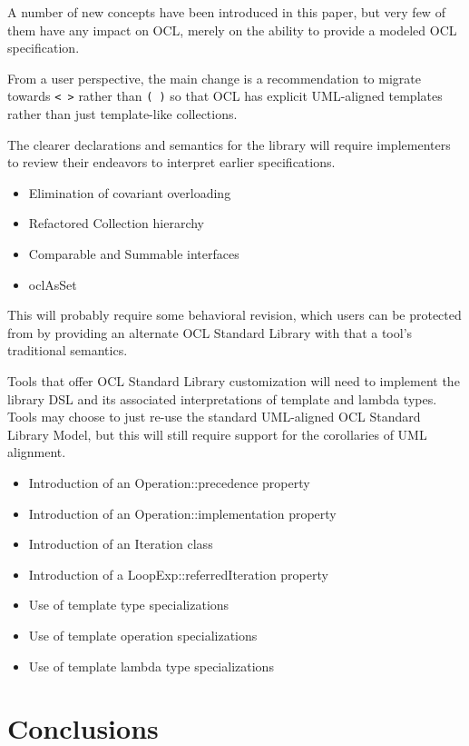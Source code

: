 \documentclass{eceasst}
\begin{document}
A number of new concepts have been introduced in this paper, but very few of them have any impact on OCL, merely on the ability to provide a modeled OCL specification.

From a user perspective, the main change is a recommendation to migrate towards \verb|< >| rather than \verb|( )| so that OCL has explicit UML-aligned templates rather than just template-like collections.

The clearer declarations and semantics for the library will require implementers to review their endeavors to interpret earlier specifications.

\begin{itemize}
\item Elimination of covariant overloading
\item Refactored Collection hierarchy
\item Comparable and Summable interfaces
\item oclAsSet
\end{itemize}

This will probably require some behavioral revision, which users can be protected from by providing an alternate OCL Standard Library with that a tool's traditional semantics.

Tools that offer OCL Standard Library customization will need to implement the library DSL and its associated interpretations of template and lambda types. Tools may choose to just re-use the standard UML-aligned OCL Standard Library Model, but this will still require support for the corollaries of UML alignment.

\begin{itemize}
\item Introduction of an Operation::precedence property
\item Introduction of an Operation::implementation property
\item Introduction of an Iteration class
\item Introduction of a LoopExp::referredIteration property 
\item Use of template type specializations
\item Use of template operation specializations
\item Use of template lambda type specializations
\end{itemize}


\section{Conclusions}
\end{document}
